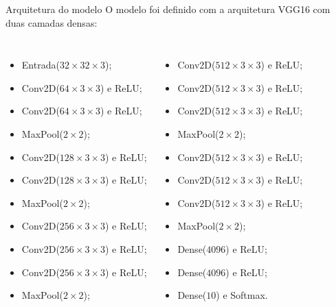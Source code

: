\begin{frame}{Arquitetura do modelo}
O modelo foi definido com a arquitetura VGG16 com duas camadas densas:
\begin{columns}[T,c]
      \scriptsize
      \begin{itemize}
        \item Entrada($32 \times 32 \times 3$);
        \item Conv2D($64 \times 3 \times 3$) e ReLU;
        \item Conv2D($64 \times 3 \times 3$) e ReLU;
        \item MaxPool($2 \times 2$);
        \item Conv2D($128 \times 3 \times 3$) e ReLU;
        \item Conv2D($128 \times 3 \times 3$) e ReLU;
        \item MaxPool($2 \times 2$);
        \item Conv2D($256 \times 3 \times 3$) e ReLU;
        \item Conv2D($256 \times 3 \times 3$) e ReLU;
        \item Conv2D($256 \times 3 \times 3$) e ReLU;
        \item MaxPool($2 \times 2$);
      \end{itemize}
      \scriptsize
      \begin{itemize}
        \item Conv2D($512 \times 3 \times 3$) e ReLU;
        \item Conv2D($512 \times 3 \times 3$) e ReLU;
        \item Conv2D($512 \times 3 \times 3$) e ReLU;
        \item MaxPool($2 \times 2$);
        \item Conv2D($512 \times 3 \times 3$) e ReLU;
        \item Conv2D($512 \times 3 \times 3$) e ReLU;
        \item Conv2D($512 \times 3 \times 3$) e ReLU;
        \item MaxPool($2 \times 2$);
        \item Dense($4096$) e ReLU;
        \item Dense($4096$) e ReLU;
        \item Dense($10$) e Softmax.
      \end{itemize}
    \end{columns}
\end{frame}

